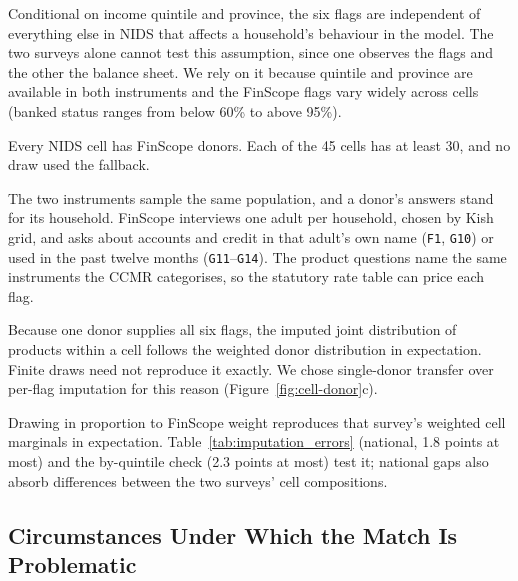 \begin{description}[style=unboxed]
\item[A1. Cell sufficiency.] Conditional on income quintile and province, the six flags are
independent of everything else in \ac{NIDS} that affects a household's behaviour in the model.
The two surveys alone cannot test this assumption, since one observes the flags and the other
the balance sheet. We rely on it because quintile and
province are available in both instruments and the \ac{FinScope} flags vary widely across cells
(banked status ranges from below 60\% to above 95\%).
\item[A2. Common support.] Every \ac{NIDS} cell has \ac{FinScope} donors. Each of the 45 cells
has at least 30, and no draw used the fallback.
\item[A3. Population comparability.] The two instruments sample the same population, and a
donor's answers stand for its household. \ac{FinScope} interviews one adult per household, chosen
by Kish grid, and asks about accounts and credit in that adult's own name (\texttt{F1},
\texttt{G10}) or used in the past twelve months (\texttt{G11}--\texttt{G14}). The product questions name the same instruments the \ac{CCMR} categorises, so the
statutory rate table can price each flag.
\item[A4. Joint-structure preservation.] Because one donor supplies all six flags, the imputed
joint distribution of products within a cell follows the weighted donor distribution in
expectation. Finite draws need not reproduce it exactly. We chose single-donor transfer over
per-flag imputation for this reason (Figure~\ref{fig:cell-donor}c).
\item[A5. Weight-proportional draw.] Drawing in proportion to \ac{FinScope} weight reproduces
that survey's weighted cell marginals in expectation. Table~\ref{tab:imputation_errors}
(national, 1.8 points at most) and the by-quintile check (2.3 points at most) test it; national
gaps also absorb differences between the two surveys' cell compositions.
\end{description}

\subsection{Circumstances Under Which the Match Is Problematic}\label{app:match-problems}

